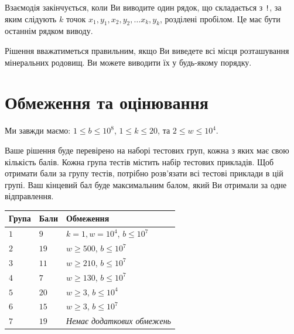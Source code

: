 Взаємодія закінчується, коли Ви виводите один рядок, що складається з \texttt{!}, за яким слідують $k$ точок $x_1, y_1, x_2, y_2, \ldots x_k, y_k$, розділені пробілом.
Це має бути останнім рядком виводу.

Рішення вважатиметься правильним, якщо Ви виведете всі місця розташування мінеральних родовищ.
Ви можете виводити їх у будь-якому порядку.

\section*{Обмеження та оцінювання}

Ми завжди маємо:
$1\leq b \leq 10^8$, %
$1 \leq k \leq 20$, %
та
$2 \le w \le 10^4$. %

Ваше рішення буде перевірено на наборі тестових груп, кожна з яких має свою кількість балів.
Кожна група тестів містить набір тестових прикладів.
Щоб отримати бали за групу тестів, потрібно розв'язати всі тестові приклади в цій групі.
Ваш кінцевий бал буде максимальним балом, який Ви отримали за одне відправлення.

\medskip
\begin{tabular}{lll}
Група & Бали & Обмеження \\\hline
  $1$ & $9$ & $k = 1, w = 10^4$, $b \le 10^7$\\
  $2$ & $19$ & $w \ge 500$, $b \le 10^7$\\
  $3$ & $11$ & $w \ge 210$, $b \le 10^7$\\
  $4$ & $7$ & $w \ge 130$, $b \le 10^7$\\
  $5$ & $20$ & $w \ge 3$, $b \le 10^4$\\
  $6$ & $15$ & $w \ge 3$, $b \le 10^7$\\
  $7$ & $19$ & \emph{Немає додаткових обмежень}
\end{tabular}

